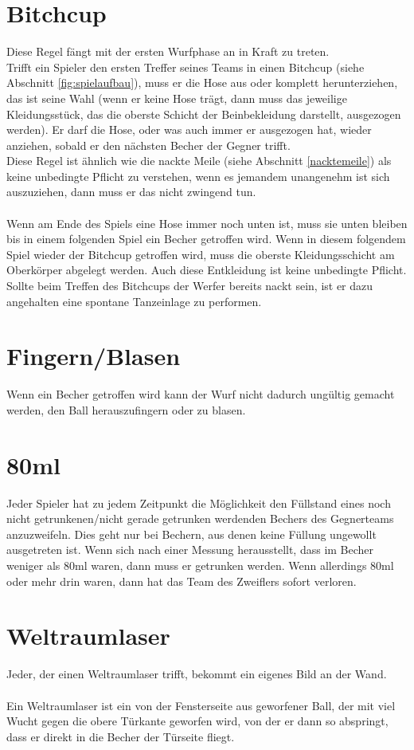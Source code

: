 \documentclass[a5paper, 12pt]{book}
\begin{document}
\section{Bitchcup}\label{bitchcup}
Diese Regel fängt mit der ersten Wurfphase an in Kraft zu treten.\\Trifft ein Spieler den ersten Treffer seines Teams in einen Bitchcup (siehe Abschnitt \ref{fig:spielaufbau}), muss er die Hose aus oder komplett herunterziehen, das ist seine Wahl (wenn er keine Hose trägt, dann muss das jeweilige Kleidungsstück, das die oberste Schicht der Beinbekleidung darstellt, ausgezogen werden). Er darf die Hose, oder was auch immer er ausgezogen hat, wieder anziehen, sobald er den nächsten Becher der Gegner trifft. \\
Diese Regel ist ähnlich wie die nackte Meile (siehe Abschnitt \ref{nacktemeile}) als keine unbedingte Pflicht zu verstehen, wenn es jemandem unangenehm ist sich auszuziehen, dann muss er das nicht zwingend tun.\\\\
Wenn am Ende des Spiels eine Hose immer noch unten ist, muss sie unten bleiben bis in einem folgenden Spiel ein Becher getroffen wird. Wenn in diesem folgendem Spiel wieder der Bitchcup getroffen wird, muss die oberste Kleidungsschicht am Oberkörper abgelegt werden. Auch diese Entkleidung ist keine unbedingte Pflicht.\\
Sollte beim Treffen des Bitchcups der Werfer bereits nackt sein, ist er dazu angehalten eine spontane Tanzeinlage zu performen.
\section{Fingern/Blasen}\label{fingern/blasen}
Wenn ein Becher getroffen wird kann der Wurf nicht dadurch ungültig gemacht werden, den Ball herauszufingern oder zu blasen.
\section{80ml}\label{80ml}
Jeder Spieler hat zu jedem Zeitpunkt die Möglichkeit den Füllstand eines noch nicht getrunkenen/nicht gerade getrunken werdenden Bechers des Gegnerteams anzuzweifeln. Dies geht nur bei Bechern, aus denen keine Füllung ungewollt ausgetreten ist. Wenn sich nach einer Messung herausstellt, dass im Becher weniger als 80ml waren, dann muss er getrunken werden. Wenn allerdings 80ml oder mehr drin waren, dann hat das Team des Zweiflers sofort verloren.
\section{Weltraumlaser}\label{weltraumlaser}
Jeder, der einen Weltraumlaser trifft, bekommt ein eigenes Bild an der Wand. \\\\ Ein Weltraumlaser ist ein von der Fensterseite aus geworfener Ball, der mit viel Wucht gegen die obere Türkante geworfen wird, von der er dann so abspringt, dass er direkt in die Becher der Türseite fliegt. 
\end{document}
